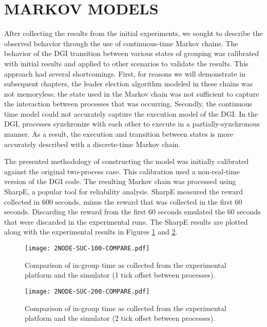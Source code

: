 \section{MARKOV MODELS}

After collecting the results from the initial experiments, we sought to describe the observed behavior through the use of continuous-time Markov chains.
The behavior of the DGI transition between various states of grouping was calibrated with initial results and applied to other scenarios to validate the results.
This approach had several shortcomings.
First, for reasons we will demonstrate in subsequent chapters, the leader election algorithm modeled in these chains was not memoryless: the state used in the Markov chain was not sufficient to capture the interaction between processes that was occurring.
Secondly, the continuous time model could not accurately capture the execution model of the DGI.
In the DGI, processes synchronize with each other to execute in a partially-synchronous manner.
As a result, the execution and transition between states is more accurately described with a discrete-time Markov chain.

The presented methodology of constructing the model was initially calibrated against the original two-process case.
This calibration used a non-real-time version of the DGI code.
The resulting Markov chain was processed using SharpE\cite{SHARPE}\cite{SHARPE2}, a popular tool for reliability analysis.
SharpE measured the reward collected in 600 seconds, minus the reward that was collected in the first 60 seconds. 
Discarding the reward from the first 60 seconds emulated the 60 seconds that were discarded in the experimental runs.
The SharpE results are plotted along with the experimental results in Figures \ref{fig:COMPARE-SUC-2NODE-100} and \ref{fig:COMPARE-SUC-2NODE-200}.

\begin{figure}[htbp]
    \centering
    \texttt{[image: 2NODE-SUC-100-COMPARE.pdf]}
    \caption{Comparison of in-group time as collected from the experimental platform and the simulator (1 tick offset between processes).}
    \label{fig:COMPARE-SUC-2NODE-100}
\end{figure}%
\begin{figure}[htbp]
    \centering
    \texttt{[image: 2NODE-SUC-200-COMPARE.pdf]}
    \caption{Comparison of in-group time as collected from the experimental platform and the simulator (2 tick offset between processes).}
    \label{fig:COMPARE-SUC-2NODE-200}
\end{figure}

